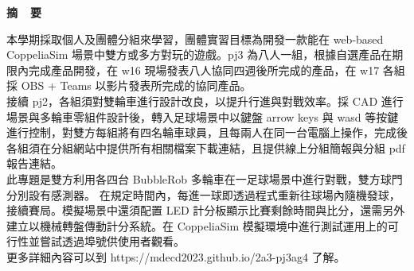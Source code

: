 \renewcommand{\baselinestretch}{1.5} %
\clearpage  %
\sectionef
{} %
\begin{center}
\LARGE\textbf{摘~~要}\\
\end{center}
\begin{flushleft}
\fontsize{14pt}{20pt}\sectionef\hspace{12pt}\quad 本學期採取個人及團體分組來學習，團體實習目標為開發一款能在 web-based CoppeliaSim 場景中雙方或多方對玩的遊戲。pj3 為八人一組，根據自選產品在期限內完成產品開發，在 w16 現場發表八人協同四週後所完成的產品，在 w17 各組採 OBS + Teams 以影片發表所完成的協同產品。\\[12pt]
\fontsize{14pt}{20pt}\sectionef\hspace{12pt}\quad  接續 pj2，各組須對雙輪車進行設計改良，以提升行進與對戰效率。採 CAD 進行場景與多輪車零組件設計後，轉入足球場景中以鍵盤 arrow keys 與 wasd 等按鍵進行控制，對雙方每組將有四名輪車球員，且每兩人在同一台電腦上操作，完成後各組須在分組網站中提供所有相關檔案下載連結，且提供線上分組簡報與分組 pdf 報告連結。\\[12pt]	
\fontsize{14pt}{20pt}\sectionef\hspace{12pt}\quad 此專題是雙方利用各四台 BubbleRob 多輪車在一足球場景中進行對戰，雙方球門分別設有感測器。 在規定時間內，每進一球即透過程式重新往球場內隨機發球，接續賽局。模擬場景中還須配置 LED 計分板顯示比賽剩餘時間與比分，還需另外建立以機械轉盤傳動計分系統。在 CoppeliaSim 模擬環境中進行測試運用上的可行性並嘗試透過埠號供使用者觀看。\\
  更多詳細內容可以到 https://mdecd2023.github.io/2a3-pj3ag4 了解。\\[10pt]

\end{flushleft}
\newpage
\renewcommand{\baselinestretch}{1.5} %
